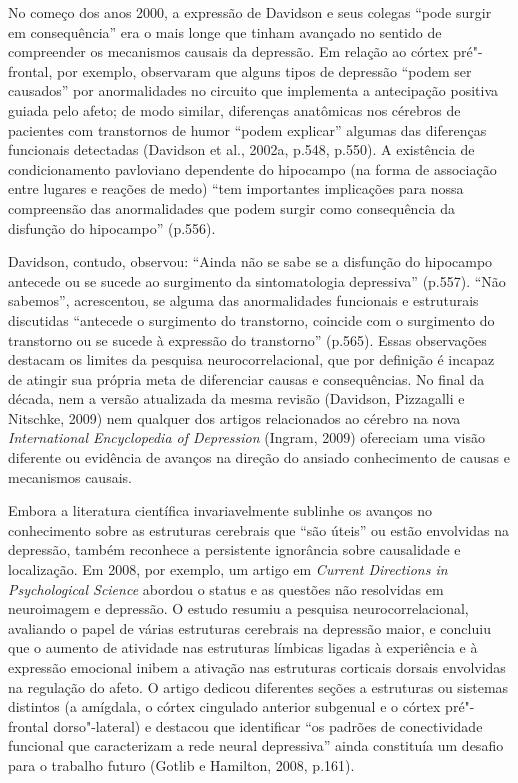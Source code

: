 No começo dos anos 2000, a expressão de Davidson e seus colegas ``pode
surgir em consequência'' era o mais longe que tinham avançado no sentido
de compreender os mecanismos causais da depressão. Em relação ao córtex
pré"-frontal, por exemplo, observaram que alguns tipos de depressão
``podem ser causados'' por anormalidades no circuito que implementa a
antecipação positiva guiada pelo afeto; de modo similar, diferenças
anatômicas nos cérebros de pacientes com transtornos de humor ``podem
explicar'' algumas das diferenças funcionais detectadas (Davidson et
al., 2002a, p.548, p.550). A existência de condicionamento pavloviano
dependente do hipocampo (na forma de associação entre lugares e reações
de medo) ``tem importantes implicações para nossa compreensão das
anormalidades que podem surgir como consequência da disfunção do
hipocampo'' (p.556).

Davidson, contudo, observou: ``Ainda não se sabe se a disfunção do
hipocampo antecede ou se sucede ao surgimento da sintomatologia
depressiva'' (p.557). ``Não sabemos'', acrescentou, se alguma das
anormalidades funcionais e estruturais discutidas ``antecede o
surgimento do transtorno, coincide com o surgimento do transtorno ou se
sucede à expressão do transtorno'' (p.565). Essas observações destacam
os limites da pesquisa neurocorrelacional, que por definição é incapaz
de atingir sua própria meta de diferenciar causas e consequências. No
final da década, nem a versão atualizada da mesma revisão (Davidson,
Pizzagalli e Nitschke, 2009) nem qualquer dos artigos relacionados ao
cérebro na nova \emph{International Encyclopedia of Depression} (Ingram,
2009) ofereciam uma visão diferente ou evidência de avanços na direção
do ansiado conhecimento de causas e mecanismos causais.

Embora a literatura científica invariavelmente sublinhe os avanços no
conhecimento sobre as estruturas cerebrais que ``são úteis'' ou estão
envolvidas na depressão, também reconhece a persistente ignorância sobre
causalidade e localização. Em 2008, por exemplo, um artigo em
\emph{Current Directions in Psychological Science} abordou o status e as
questões não resolvidas em neuroimagem e depressão. O estudo resumiu a
pesquisa neurocorrelacional, avaliando o papel de várias estruturas
cerebrais na depressão maior, e concluiu que o aumento de atividade nas
estruturas límbicas ligadas à experiência e à expressão emocional inibem
a ativação nas estruturas corticais dorsais envolvidas na regulação do
afeto. O artigo dedicou diferentes seções a estruturas ou sistemas
distintos (a amígdala, o córtex cingulado anterior subgenual e o córtex
pré"-frontal dorso"-lateral) e destacou que identificar ``os padrões de
conectividade funcional que caracterizam a rede neural depressiva''
ainda constituía um desafio para o trabalho futuro (Gotlib e Hamilton,
2008, p.161).

